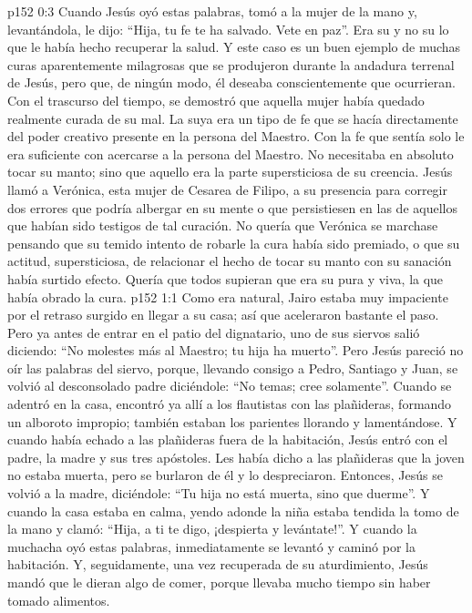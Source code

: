 \vs p152 0:3 Cuando Jesús oyó estas palabras, tomó a la mujer de la mano y, levantándola, le dijo: “Hija, tu fe te ha salvado. Vete en paz”. Era su  y no su  lo que le había hecho recuperar la salud. Y este caso es un buen ejemplo de muchas curas aparentemente milagrosas que se produjeron durante la andadura terrenal de Jesús, pero que, de ningún modo, él deseaba conscientemente que ocurrieran. Con el trascurso del tiempo, se demostró que aquella mujer había quedado realmente curada de su mal. La suya era un tipo de fe que se hacía directamente del poder creativo presente en la persona del Maestro. Con la fe que sentía solo le era suficiente con acercarse a la persona del Maestro. No necesitaba en absoluto tocar su manto; sino que aquello era la parte supersticiosa de su creencia. Jesús llamó a Verónica, esta mujer de Cesarea de Filipo, a su presencia para corregir dos errores que podría albergar en su mente o que persistiesen en las de aquellos que habían sido testigos de tal curación. No quería que Verónica se marchase pensando que su temido intento de robarle la cura había sido premiado, o que su actitud, supersticiosa, de relacionar el hecho de tocar su manto con su sanación había surtido efecto. Quería que todos supieran que era su  pura y viva, la que había obrado la cura.
\vs p152 1:1 Como era natural, Jairo estaba muy impaciente por el retraso surgido en llegar a su casa; así que aceleraron bastante el paso. Pero ya antes de entrar en el patio del dignatario, uno de sus siervos salió diciendo: “No molestes más al Maestro; tu hija ha muerto”. Pero Jesús pareció no oír las palabras del siervo, porque, llevando consigo a Pedro, Santiago y Juan, se volvió al desconsolado padre diciéndole: “No temas; cree solamente”. Cuando se adentró en la casa, encontró ya allí a los flautistas con las plañideras, formando un alboroto impropio; también estaban los parientes llorando y lamentándose. Y cuando había echado a las plañideras fuera de la habitación, Jesús entró con el padre, la madre y sus tres apóstoles. Les había dicho a las plañideras que la joven no estaba muerta, pero se burlaron de él y lo despreciaron. Entonces, Jesús se volvió a la madre, diciéndole: “Tu hija no está muerta, sino que duerme”. Y cuando la casa estaba en calma, yendo adonde la niña estaba tendida la tomo de la mano y clamó: “Hija, a ti te digo, ¡despierta y levántate!”. Y cuando la muchacha oyó estas palabras, inmediatamente se levantó y caminó por la habitación. Y, seguidamente, una vez recuperada de su aturdimiento, Jesús mandó que le dieran algo de comer, porque llevaba mucho tiempo sin haber tomado alimentos.
